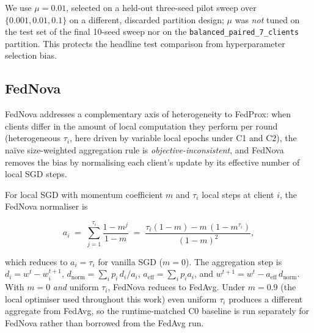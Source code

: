 \documentclass[11pt,a4paper]{report}  %
\begin{document}
We use $\mu = 0.01$, selected on a held-out three-seed pilot sweep
over $\{0.001, 0.01, 0.1\}$ on a different, discarded partition
design; $\mu$ was \emph{not} tuned on the test set of the final
10-seed sweep nor on the \texttt{balanced\_paired\_7\_clients}
partition. This protects the headline test comparison from
hyperparameter selection bias.


\subsection{FedNova}
\label{sec:fednova}


FedNova \citep{wang2020fednova} addresses a complementary axis of
heterogeneity to FedProx: when clients differ in the amount of local
computation they perform per round (heterogeneous $\tau_i$, here
driven by variable local epochs under C1 and C2), the naïve
size-weighted aggregation rule is \emph{objective-inconsistent}, and
FedNova removes the bias by normalising each client's update by its
effective number of local SGD steps.

For local SGD with momentum coefficient $m$ and $\tau_i$ local steps
at client $i$, the FedNova normaliser is

\begin{equation}
a_i \;=\; \sum_{j=1}^{\tau_i} \frac{1 - m^j}{1 - m}
       \;=\; \frac{\tau_i (1 - m) - m\,(1 - m^{\tau_i})}{(1-m)^2},
\label{eq:fednova-ai-method}
\end{equation}

which reduces to $a_i = \tau_i$ for vanilla SGD ($m = 0$). The
aggregation step is $d_i = w^t - w_i^{t+1}$,
$d_\text{norm} = \sum_i p_i\,d_i / a_i$,
$a_\text{eff} = \sum_i p_i a_i$, and
$w^{t+1} = w^t - a_\text{eff}\,d_\text{norm}$. With $m = 0$ \emph{and}
uniform $\tau_i$, FedNova reduces to FedAvg. Under $m = 0.9$ (the
local optimiser used throughout this work) even uniform $\tau_i$
produces a different aggregate from FedAvg, so the runtime-matched C0
baseline is run separately for FedNova rather than borrowed from the
FedAvg run.
\end{document}
